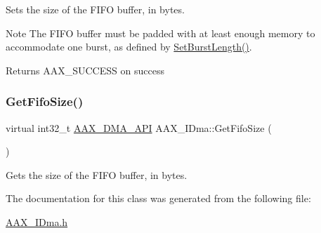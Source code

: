 Sets the size of the F\+I\+FO buffer, in bytes. 

\begin{DoxyNote}{Note}
The F\+I\+FO buffer must be padded with at least enough memory to accommodate one burst, as defined by \mbox{\hyperlink{a01809_ac85fdea20b072cbdc258aa398d02fa92}{Set\+Burst\+Length()}}.
\end{DoxyNote}
\begin{DoxyReturn}{Returns}
{\ttfamily A\+A\+X\+\_\+\+S\+U\+C\+C\+E\+SS} on success 
\end{DoxyReturn}
\mbox{\label{a01809_aae573c01b6ecc918978f74881e87a761}} 
\subsubsection{\texorpdfstring{GetFifoSize()}{GetFifoSize()}}
{\footnotesize\ttfamily virtual int32\+\_\+t \mbox{\hyperlink{a00587_acae60d01e5e4bd3282369d0d9d378f3f}{A\+A\+X\+\_\+\+D\+M\+A\+\_\+\+A\+PI}} A\+A\+X\+\_\+\+I\+Dma\+::\+Get\+Fifo\+Size (\begin{DoxyParamCaption}{ }\end{DoxyParamCaption})\hspace{0.3cm}{\ttfamily [pure virtual]}}



Gets the size of the F\+I\+FO buffer, in bytes. 



The documentation for this class was generated from the following file\+:\begin{DoxyCompactItemize}
\item 
\mbox{\hyperlink{a00587}{A\+A\+X\+\_\+\+I\+Dma.\+h}}\end{DoxyCompactItemize}
